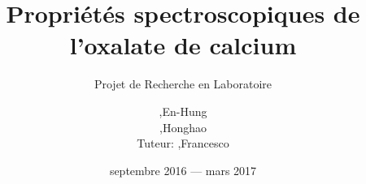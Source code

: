 \title{Propriétés spectroscopiques de l'oxalate de calcium}
\subtitle{Projet de Recherche en Laboratoire}
\author{\begin{tabularx}{\textwidth}{RL}
    ,& En-Hung\\
    ,& Honghao\\
    Tuteur: ,& Francesco
  \end{tabularx}
}
\date{septembre 2016 --- mars 2017}
